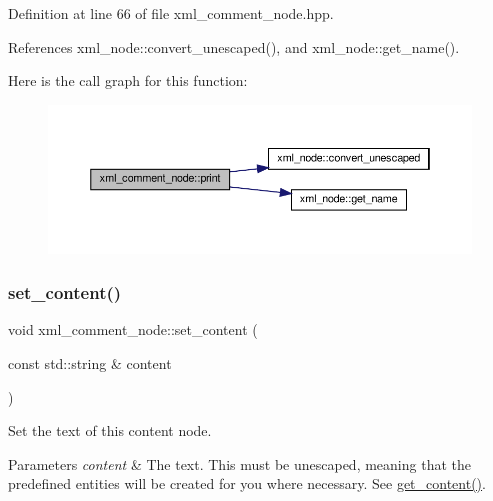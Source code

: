 Definition at line 66 of file xml\+\_\+comment\+\_\+node.\+hpp.



References xml\+\_\+node\+::convert\+\_\+unescaped(), and xml\+\_\+node\+::get\+\_\+name().

Here is the call graph for this function\+:
\nopagebreak
\begin{figure}[H]
\begin{center}
\leavevmode
\includegraphics[width=350pt]{dc/d8b/classxml__comment__node_aadac3ffa2503b92217be8ff569c6c9a2_cgraph}
\end{center}
\end{figure}
\mbox{\label{classxml__comment__node_a4f34eb5787506cbfb784fb7c5f927423}} 
\subsubsection{\texorpdfstring{set\+\_\+content()}{set\_content()}}
{\footnotesize\ttfamily void xml\+\_\+comment\+\_\+node\+::set\+\_\+content (\begin{DoxyParamCaption}\item[{const std\+::string \&}]{content }\end{DoxyParamCaption})\hspace{0.3cm}{\ttfamily [inline]}}



Set the text of this content node. 


\begin{DoxyParams}{Parameters}
{\em content} & The text. This must be unescaped, meaning that the predefined entities will be created for you where necessary. See \hyperlink{classxml__comment__node_ae1f14567e56f0c3d70e1b7d05765093a}{get\+\_\+content()}. \\
\hline
\end{DoxyParams}


